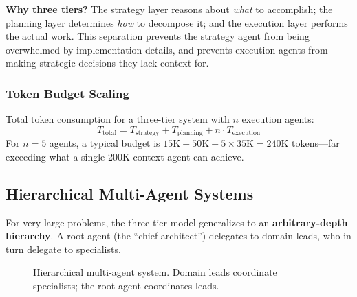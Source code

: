 \documentclass[11pt,letterpaper,twocolumn]{article}
\begin{document}
\textbf{Why three tiers?}  The strategy layer reasons about \emph{what} to
accomplish; the planning layer determines \emph{how} to decompose it; and the
execution layer performs the actual work.  This separation prevents the
strategy agent from being overwhelmed by implementation details, and prevents
execution agents from making strategic decisions they lack context for.

\subsubsection{Token Budget Scaling}

Total token consumption for a three-tier system with $n$ execution agents:
\[
  T_{\text{total}} = T_{\text{strategy}} + T_{\text{planning}}
    + n \cdot T_{\text{execution}}
\]
For $n = 5$ agents, a typical budget is $15\text{K} + 50\text{K} + 5 \times
35\text{K} = 240\text{K}$ tokens---far exceeding what a single 200K-context
agent can achieve.

\subsection{Hierarchical Multi-Agent Systems}

For very large problems, the three-tier model generalizes to an
\textbf{arbitrary-depth hierarchy}.  A root agent (the ``chief architect'')
delegates to domain leads, who in turn delegate to specialists.

\begin{figure}[t]
\centering
{}
\caption{Hierarchical multi-agent system.  Domain leads coordinate
  specialists; the root agent coordinates leads.}
\label{fig:hmas}
\end{figure}
\end{document}
